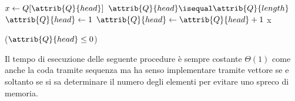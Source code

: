 \begin{codebox}
\li $x \gets Q[\attrib{Q}{head}]$
\li \If $\attrib{Q}{head} \isequal \attrib{Q}{length}$
\li \Then $\attrib{Q}{head} \gets 1$
\li \Else $\attrib{Q}{head} \gets \attrib{Q}{head} + 1$
\li \Return x
\end{codebox}

\begin{codebox}
\li \Return ($\attrib{Q}{head} \leq 0$)
\end{codebox}

Il tempo di esecuzione delle seguente procedure è sempre costante $\Theta(1)$
come anche la coda tramite sequenza ma ha senso implementare tramite vettore se e soltanto se
si sa determinare il numero degli elementi per evitare uno spreco di memoria.
